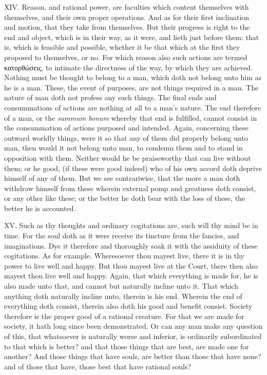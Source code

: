 XIV. Reason, and rational power, are faculties which content themselves
with themselves, and their own proper operations. And as for their first
inclination and motion, that they take from themselves. But their
progress is right to the end and object, which is in their way, as it
were, and lieth just before them: that is, which is feasible and
possible, whether it be that which at the first they proposed to
themselves, or no. For which reason also such actions are termed
κατορθώσεις, to
intimate the directness of the way, by which they are achieved. Nothing
must be thought to belong to a man, which doth not belong unto him as he
is a man. These, the event of purposes, are not things required in a man.
The nature of man doth not profess any such things. The final ends and
consummations of actions are nothing at all to a man's nature. The end
therefore of a man, or the \emph{summum bonum} whereby that end is
fulfilled, cannot consist in the consummation of actions purposed and
intended. Again, concerning these outward worldly things, were it so that
any of them did properly belong unto man, then would it not belong unto
man, to condemn them and to stand in opposition with them. Neither would
he be praiseworthy that can live without them; or he good, (if these were
good indeed) who of his own accord doth deprive himself of any of them.
But we see contrariwise, that the more a man doth withdraw himself from
these wherein external pomp and greatness doth consist, or any other like
these; or the better he doth bear with the loss of these, the better he
is accounted.

XV. Such as thy thoughts and ordinary cogitations are, such will thy
mind be in time. For the soul doth as it were receive its tincture from
the fancies, and imaginations. Dye it therefore and thoroughly soak it
with the assiduity of these cogitations. As for example. Wheresoever thou
mayest live, there it is in thy power to live well and happy. But thou
mayest live at the Court, there then also mayest thou live well and happy.
Again, that which everything is made for, he is also made unto that, and
cannot but naturally incline unto it. That which anything doth naturally
incline unto, therein is his end. Wherein the end of everything doth
consist, therein also doth his good and benefit consist. Society therefore
is the proper good of a rational creature. For that we are made for
society, it hath long since been demonstrated. Or can any man make any
question of this, that whatsoever is naturally worse and inferior, is
ordinarily subordinated to that which is better? and that those things
that are best, are made one for another? And those things that have souls,
are better than those that have none? and of those that have, those best
that have rational souls?


